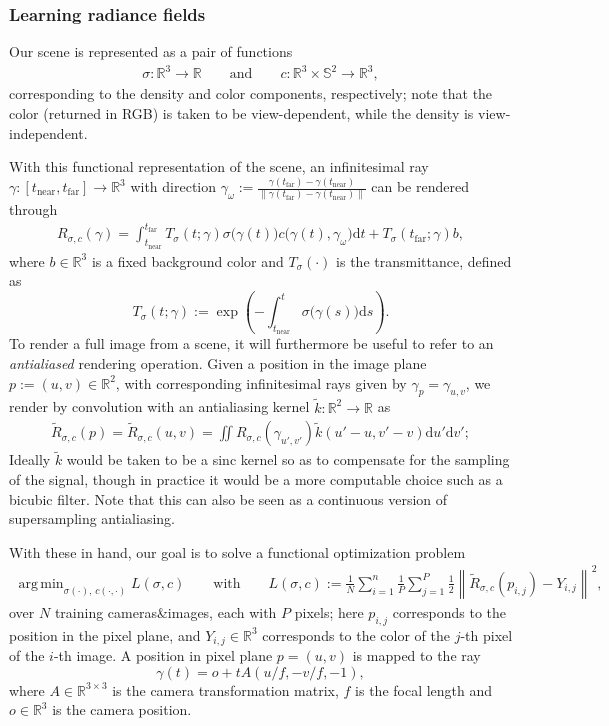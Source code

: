 \documentclass{article}
\newcommand{\R}{\mathbb{R}}
\DeclareMathOperator*{\argmin}{arg\,min}
\newcommand{\dif}{\mathrm{d}}
\newcommand\norm[1]{\left\lVert#1\right\rVert}
\newcommand{\render}{{R}}
\newcommand{\near}{\mathrm{near}}
\newcommand{\far}{\mathrm{far}}
\begin{document}
\subsubsection{Learning radiance fields}\label{suppl:sec:functional-gradient-3d}

Our scene is represented as a pair of functions
\begin{align*}
    \sigma : \R^3 \to \R
    \qquad\text{and}\qquad
    c : \R^3 \times \mathbb{S}^2 \to \R^3,
\end{align*}
corresponding to the density and color components, respectively; note that the color (returned in RGB) is taken to be view-dependent, while the density is view-independent.

With this functional representation of the scene, an infinitesimal ray $\gamma : [t_\near, t_\far] \to \R^3$ with direction $\gamma_\omega := \frac{\gamma(t_\far) - \gamma(t_\near)}{\norm{\gamma(t_\far) - \gamma(t_\near)}}$ can be rendered through
\begin{align*}
    \render_{\sigma,c}(\gamma) = \int_{t_\near}^{t_\far} T_\sigma(t; \gamma) \sigma\big(\gamma(t)\big) c\big(\gamma(t), \gamma_\omega\big) \dif t + T_\sigma(t_\far; \gamma) b,
\end{align*}
where $b \in \R^3$ is a fixed background color and $T_\sigma(\cdot)$ is the transmittance, defined as
\[ T_\sigma(t; \gamma) := \exp\left( -\int_{t_\near}^t \sigma\big(\gamma(s)\big) \dif s \right). \]
To render a full image from a scene, it will furthermore be useful to refer to an \emph{antialiased} rendering operation. Given a position in the image plane $p := (u, v) \in \R^2$, with corresponding infinitesimal rays given by $\gamma_p = \gamma_{u,v}$, we render by convolution with an antialiasing kernel $\widetilde{k} : \R^2 \to \R$ as
\begin{align*}
    \widetilde{\render}_{\sigma,c}(p) = \widetilde{\render}_{\sigma,c}(u, v)
    = \iint \render_{\sigma,c}(\gamma_{u',v'}) \widetilde{k}(u' - u, v' - v) \dif u' \dif v';
\end{align*}
Ideally $\widetilde{k}$ would be taken to be a sinc kernel so as to compensate for the sampling of the signal, though in practice it would be a more computable choice such as a bicubic filter.
Note that this can also be seen as a continuous version of supersampling antialiasing.

With these in hand, our goal is to solve a functional optimization problem
\begin{align}
    \argmin_{\sigma(\cdot),\,c(\cdot, \cdot)} L(\sigma, c) \qquad\text{with}\qquad L(\sigma, c) := \frac{1}{N} \sum_{i=1}^n \frac{1}{P} \sum_{j=1}^P \frac{1}{2} \norm{ \widetilde{\render}_{\sigma,c}(p_{i,j}) - Y_{i,j} }^2,
\end{align}
over $N$ training cameras\&images, each with $P$ pixels; here $p_{i,j}$ corresponds to the position in the pixel plane, and $Y_{i,j} \in \R^3$ corresponds to the color of the $j$-th pixel of the $i$-th image.
A position in pixel plane $p = (u,v)$ is mapped to the ray
\[ \gamma(t) = o + t A (u/f, -v/f, -1), \]
where $A \in \R^{3 \times 3}$ is the camera transformation matrix, $f$ is the focal length and $o \in \R^3$ is the camera position.
\end{document}
